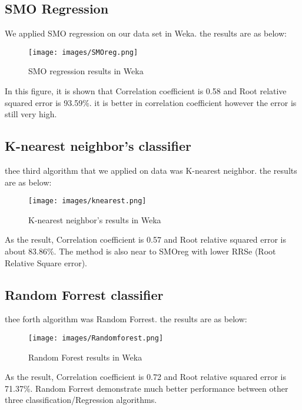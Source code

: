 \documentclass{article}
\begin{document}
\subsection{SMO Regression}
We applied SMO regression on our data set in Weka. the results are as below:\\
\begin{figure}[H]
\centering
    \texttt{[image: images/SMOreg.png]}
    \caption{SMO regression results in Weka}
\end{figure}
In this figure, it is shown that Correlation coefficient is 0.58 and Root relative squared error is 93.59\%. it is better in correlation coefficient however the error is still very high.
\subsection{K-nearest neighbor's classifier}
thee third algorithm that we applied on data was K-nearest neighbor. the results are as below: \\
\begin{figure}[H]
\centering
    \texttt{[image: images/knearest.png]}
    \caption{K-nearest neighbor's results in Weka}
\end{figure}
As the result, Correlation coefficient is 0.57 and Root relative squared error is about 83.86\%. The method is also near to SMOreg with lower RRSe (Root Relative Square error).
\subsection{Random Forrest classifier}
thee forth algorithm was Random Forrest. the results are as below: 
\begin{figure}[H]
\centering
    \texttt{[image: images/Randomforest.png]}
    \caption{Random Forest results in Weka}
\end{figure}
As the result, Correlation coefficient is 0.72 and Root relative squared error is 71.37\%. Random Forrest demonstrate much better performance between other three classification/Regression algorithms.
\end{document}
